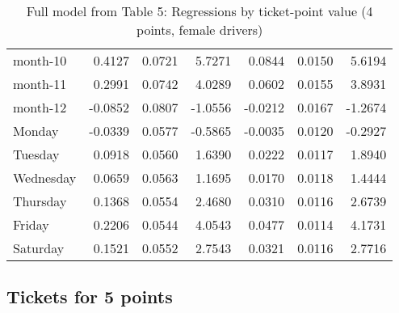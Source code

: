 \documentclass[10pt]{article}
\begin{document}
\begin{table}[ht]
\begin{tabular}{lrrrrrr}
  month-10 & 0.4127 & 0.0721 & 5.7271 & 0.0844 & 0.0150 & 5.6194 \\ 
  month-11 & 0.2991 & 0.0742 & 4.0289 & 0.0602 & 0.0155 & 3.8931 \\ 
  month-12 & -0.0852 & 0.0807 & -1.0556 & -0.0212 & 0.0167 & -1.2674 \\ 
  Monday & -0.0339 & 0.0577 & -0.5865 & -0.0035 & 0.0120 & -0.2927 \\ 
  Tuesday & 0.0918 & 0.0560 & 1.6390 & 0.0222 & 0.0117 & 1.8940 \\ 
  Wednesday & 0.0659 & 0.0563 & 1.1695 & 0.0170 & 0.0118 & 1.4444 \\ 
  Thursday & 0.1368 & 0.0554 & 2.4680 & 0.0310 & 0.0116 & 2.6739 \\ 
  Friday & 0.2206 & 0.0544 & 4.0543 & 0.0477 & 0.0114 & 4.1731 \\ 
  Saturday & 0.1521 & 0.0552 & 2.7543 & 0.0321 & 0.0116 & 2.7716 \\ 
   \hline
\end{tabular}
\caption{Full model from Table 5: Regressions by ticket-point value (4 points, female drivers)} 
\label{tab_5_4_pts_no_age_F}
\end{table}


\clearpage
\pagebreak




\subsection{Tickets for 5 points}



\end{document}
